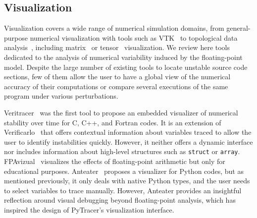 \documentclass[11pt]{article}
\newcommand{\tristan}[1]{\color{orange}\textbf{From Tristan:} #1\color{black}\xspace}
\newcommand{\pytracer}[0]{PyTracer\xspace}
\begin{document}


\subsection{Visualization}

Visualization covers a wide range of numerical simulation domains, from general-purpose numerical visualization with tools
such as VTK~\cite{schroeder2000visualizing} to topological data analysis~\cite{tierny2018topological}, including matrix~\cite{wu2008matrix} or tensor~\cite{kindlmann2006diffusion} visualization.
We review here tools dedicated to the analysis of numerical variability induced by the floating-point model. Despite the large number of existing tools  to locate unstable source code sections, few of them allow the user to have a global view of the numerical accuracy of their computations or compare several executions of the same program under various perturbations.

Veritracer~\cite{chatelain2018veritracer} was the first tool to propose an embedded visualizer of numerical stability over time for C, C++, and Fortran codes. It is an extension of Verificarlo~\cite{verificarlo} that offers contextual information about variables traced to allow the user to identify instabilities quickly.
However, it neither offers a dynamic interface nor includes information about high-level structures such as \texttt{struct} or \texttt{array}.
FPAvizual~\cite{gu2014fpavisual} visualizes the effects of floating-point arithmetic but only for educational purposes.
Anteater~\cite{faust2019anteater} proposes a visualizer for Python codes, but as mentioned previously, it only deals with native Python types, and the user needs to select variables to trace manually. However, Anteater provides an insightful reflection 
around visual debugging beyond floating-point analysis, which has inspired the design of \pytracer's visualization interface.
\end{document}
